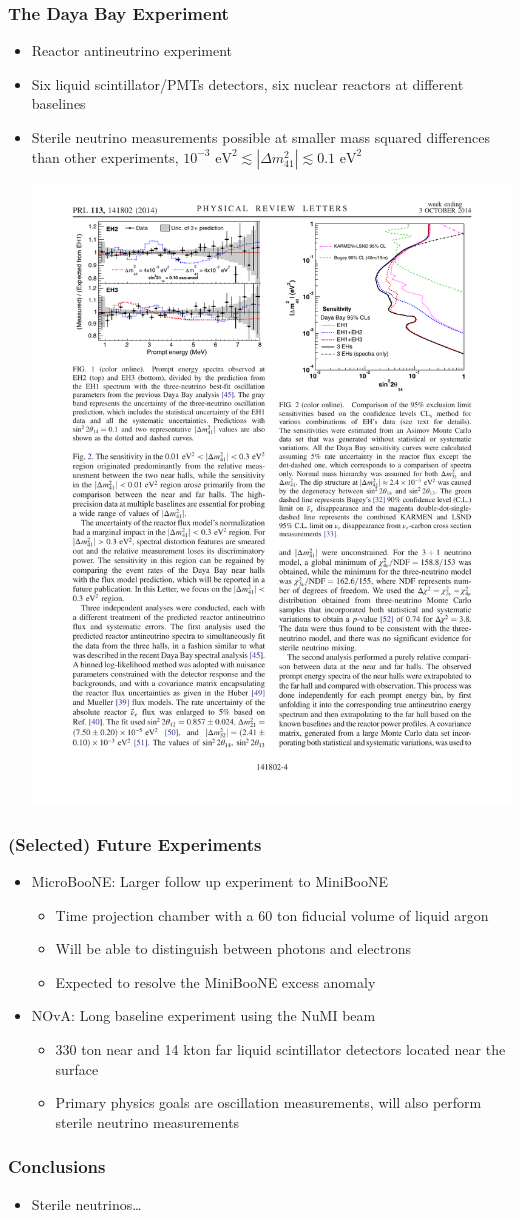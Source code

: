 \documentclass[mathserif,18pt,xcolor=table]{beamer}
\begin{document}
\begin{frame}
  \frametitle{The Daya Bay Experiment}
  \begin{itemize}
  \item Reactor antineutrino experiment
  \item Six liquid scintillator/PMTs detectors, six nuclear reactors at different baselines
  \item Sterile neutrino measurements possible at smaller mass squared differences than other experiments, $10^{−3} \text{ eV}^2  \lesssim \left|\Delta m^{2}_{41}\right| \lesssim 0.1 \text{ eV}^2$
    \begin{center}
      \includegraphics[width=.5\linewidth]{../figures/daya1.pdf}
    \end{center}
  \end{itemize}
\end{frame}

\begin{frame}
  \frametitle{(Selected) Future Experiments}
  \begin{itemize}
  \item MicroBooNE: Larger follow up experiment to MiniBooNE
   \begin{itemize}
     \item Time projection chamber with a 60 ton fiducial volume of liquid argon
     \item Will be able to distinguish between photons and electrons
     \item Expected to resolve the MiniBooNE excess anomaly
   \end{itemize}
  \item NOvA: Long baseline experiment using the NuMI beam
   \begin{itemize}
     \item 330 ton near and 14 kton far liquid scintillator detectors located near the surface
     \item Primary physics goals are oscillation measurements, will also perform sterile neutrino measurements
   \end{itemize}
  \end{itemize}
\end{frame}


\begin{frame}
  \frametitle{Conclusions}
  \begin{itemize}
  \item Sterile neutrinos\ldots
  \end{itemize}
\end{frame}
\end{document}
